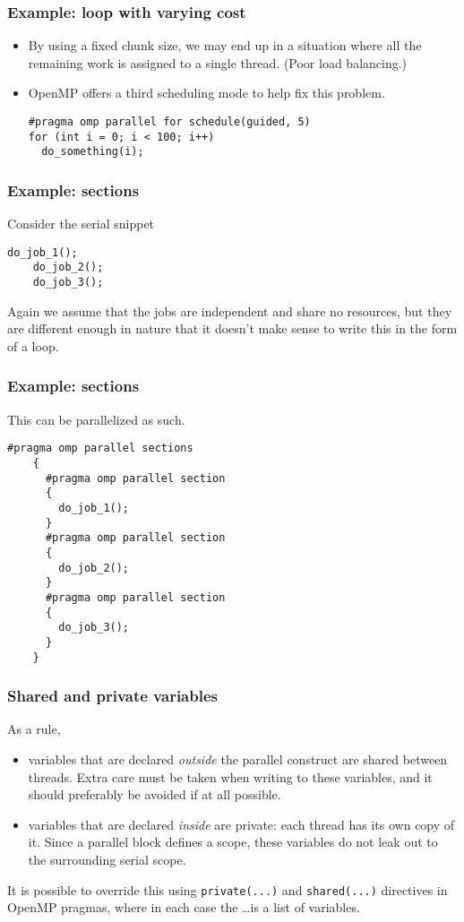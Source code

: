 \begin{frame}[fragile]
  \frametitle{Example: loop with varying cost}
  \begin{itemize}
  \item By using a fixed chunk size, we may end up in a situation where all the
    remaining work is assigned to a single thread. (Poor load balancing.)
  \item OpenMP offers a third scheduling mode to help fix this problem.
  \begin{lstlisting}[style=c]
#pragma omp parallel for schedule(guided, 5)
for (int i = 0; i < 100; i++)
  do_something(i);
  \end{lstlisting}
  \end{itemize}
\end{frame}

\begin{frame}[fragile]
  \frametitle{Example: sections}
  Consider the serial snippet
  \begin{lstlisting}[style=c]
    do_job_1();
    do_job_2();
    do_job_3();
  \end{lstlisting}
  Again we assume that the jobs are independent and share no resources, but they
  are different enough in nature that it doesn't make sense to write this in the
  form of a loop.
\end{frame}

\begin{frame}[fragile]
  \frametitle{Example: sections}
  This can be parallelized as such.
  \begin{lstlisting}[style=c, basicstyle=\ttfamily\footnotesize]
    #pragma omp parallel sections
    {
      #pragma omp parallel section
      {
        do_job_1();
      }
      #pragma omp parallel section
      {
        do_job_2();
      }
      #pragma omp parallel section
      {
        do_job_3();
      }
    }
  \end{lstlisting}
\end{frame}

\begin{frame}[fragile]
  \frametitle{Shared and private variables}
  As a rule,
  \begin{itemize}
  \item variables that are declared \emph{outside} the parallel construct are
    shared between threads. Extra care must be taken when writing to these
    variables, and it should preferably be avoided if at all possible.
  \item variables that are declared \emph{inside} are private: each thread has
    its own copy of it. Since a parallel block defines a scope, these variables
    do not leak out to the surrounding serial scope.
  \end{itemize}
  It is possible to override this using \texttt{private(...)} and
  \texttt{shared(...)} directives in OpenMP pragmas, where in each case the
  \ldots is a list of variables.
\end{frame}

